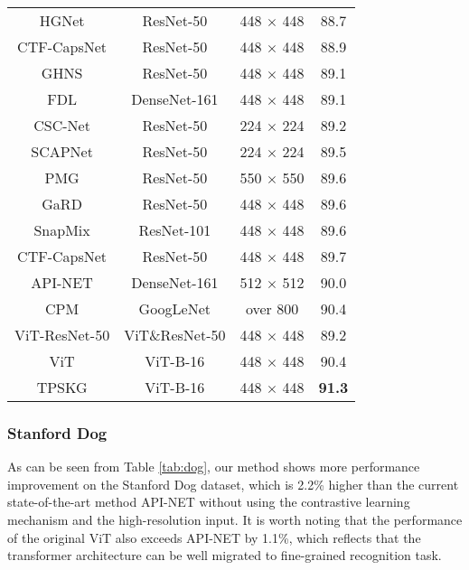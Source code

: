 \documentclass[5p,twocolumn]{elsarticle}
\begin{document}
\begin{table}[h]
{\begin{tabular}{|c|c|c|c|}
HGNet    \cite{CHEN2021}  & ResNet-50    & 448 $\times$ 448    & 88.7         \\
CTF-CapsNet \cite{Lin2021}  & ResNet-50    & 448 $\times$ 448    & 88.9         \\
GHNS \cite{Kim2021}         & ResNet-50    & 448 $\times$ 448    & 89.1       \\
FDL     \cite{Liu2020Filtration}  & DenseNet-161 & 448 $\times$ 448    & 89.1         \\
CSC-Net  \cite{Wang2020Category}  & ResNet-50 & 224 $\times$ 224    & 89.2         \\
SCAPNet \cite{Liu2021Learning} & ResNet-50 & 224 $\times$ 224    & 89.5         \\
PMG     \cite{Du2020Fine}  & ResNet-50    & 550 $\times$ 550    & 89.6         \\
GaRD \cite{Zhao_2021_CVPR}  & ResNet-50    & 448 $\times$ 448    & 89.6         \\
SnapMix \cite{Huang2021SnapMix} & ResNet-101    & 448 $\times$ 448    & 89.6         \\
CTF-CapsNet \cite{Lin2021}  & ResNet-50    & 448 $\times$ 448    & 89.7         \\
API-NET  \cite{Zhuang2020Learning} & DenseNet-161 & 512 $\times$ 512    & 90.0         \\
CPM   \cite{Ge2019Weakly} & GoogLeNet    & over 800   & 90.4         \\\hline
ViT-ResNet-50                             & ViT\&ResNet-50     & 448 $\times$ 448    & 89.2         \\
ViT   \cite{Dosovitskiy2021Image}    & ViT-B-16     & 448 $\times$ 448    & 90.4         \\
TPSKG      & ViT-B-16     & 448 $\times$ 448    & \textbf{91.3}         \\\hline
\end{tabular}}
\end{table}





\subsubsection{\textbf{Stanford Dog}}
As can be seen from Table \ref{tab:dog}, our method shows more performance improvement on the Stanford Dog dataset, which is 2.2\% higher than the current state-of-the-art method API-NET \cite{Zhuang2020Learning} without using the contrastive learning mechanism and the high-resolution input. It is worth noting that the performance of the original ViT also exceeds  API-NET by 1.1\%, which reflects that the transformer architecture can be well migrated to fine-grained recognition task. 
\end{document}
